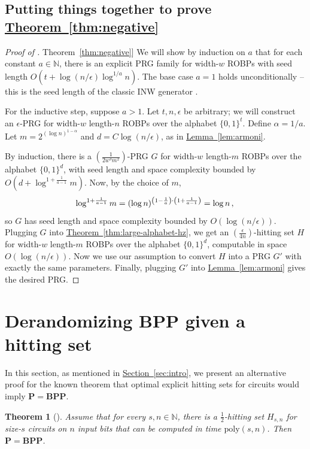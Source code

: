 \documentclass[11pt]{article}
\numberwithin{equation}{section}
\newtheorem{theorem}{Theorem}[section]
\theoremstyle{definition}
\theoremstyle{plain}
\newcommand{\N}{\mathbb N}
\newcommand{\expref}[2]{\hyperref[#2]{#1~\ref{#2}}}
\begin{document}
\subsection{Putting things together to prove \expref{Theorem}{thm:negative}}
\begin{proof}[Proof of \expref{Theorem}{thm:negative}]
We will show by induction on $a$ that for each constant $a \in \N$, there is an explicit PRG family for width-$w$ ROBPs with seed length $O(t + \log(n/\epsilon) \log^{1/a} n)$. The base case $a = 1$ holds unconditionally -- this is the seed length of the classic INW generator \cite{INW94}.

For the inductive step, suppose $a > 1$. Let $t, n, \epsilon$ be arbitrary; we will construct an $\epsilon$-PRG for width-$w$ length-$n$ ROBPs over the alphabet $\{0, 1\}^t$. Define $\alpha = 1/a$. Let $m = 2^{(\log n)^{1 - \alpha}}$ and $d = C \log(n/\epsilon)$, as in \expref{Lemma}{lem:armoni}.

By induction, there is a $(\frac{1}{2w^3 m^2})$-PRG $G$ for width-$w$ length-$m$ ROBPs over the alphabet $\{0, 1\}^d$, with seed length and space complexity bounded by $O(d + \log^{1 + \frac{1}{a - 1}} m)$. Now, by the choice of $m$,
$$
\log^{1 + \frac{1}{a - 1}} m = (\log n)^{\left(1 - \frac{1}{a}\right)\cdot \left(1 + \frac{1}{a - 1}\right)} = \log n\,, \\
$$
so $G$ has seed length and space complexity bounded by $O(\log(n/\epsilon))$. Plugging $G$ into \expref{Theorem}{thm:large-alphabet-hz}, we get an $(\frac{\epsilon}{4n})$-hitting set $H$ for width-$w$ length-$m$ ROBPs over the alphabet $\{0, 1\}^d$, computable in space $O(\log(n/\epsilon))$. Now we use our assumption to convert $H$ into a PRG $G'$ with exactly the same parameters. Finally, plugging $G'$ into \expref{Lemma}{lem:armoni} gives the desired PRG.
\end{proof}

\section{Derandomizing $\mathbf{BPP}$ given a hitting set} \label{sec:bpp}

In this section, as mentioned in \expref{Section}{sec:intro}, we present an alternative proof for the known theorem that optimal explicit hitting sets for circuits would imply $\mathbf{P} = \mathbf{BPP}$.

\begin{theorem}[\cite{ACR98}]
Assume that for every $s, n \in \N$, there is a $\frac{1}{2}$-hitting set $H_{s, n}$ for size-$s$ circuits on $n$ input bits that can be computed in time $\text{poly}(s, n)$. Then $\mathbf{P} = \mathbf{BPP}$.
\end{theorem}
\end{document}
